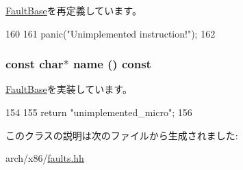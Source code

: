 \hyperlink{classFaultBase_a2bd783b42262278d41157d428e1f8d6f}{FaultBase}を再定義しています。


\begin{DoxyCode}
160         {
161             panic("Unimplemented instruction!");
162         }
\end{DoxyCode}
\hypertarget{classX86ISA_1_1UnimpInstFault_a862958aa3c2b9bf36903f1f0f2e81c54}{
\subsubsection[{name}]{\setlength{\rightskip}{0pt plus 5cm}const char$\ast$ name () const}}
\label{classX86ISA_1_1UnimpInstFault_a862958aa3c2b9bf36903f1f0f2e81c54}


\hyperlink{classFaultBase_aad960357563b8b969d2dffdcc6861de7}{FaultBase}を実装しています。


\begin{DoxyCode}
154         {
155             return "unimplemented_micro";
156         }
\end{DoxyCode}


このクラスの説明は次のファイルから生成されました:\begin{DoxyCompactItemize}
\item 
arch/x86/\hyperlink{arch_2x86_2faults_8hh}{faults.hh}\end{DoxyCompactItemize}
